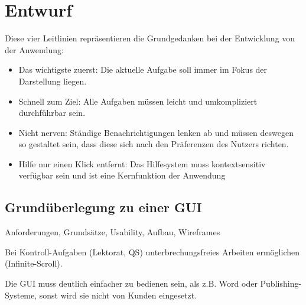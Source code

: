 \section{Entwurf}\label{l:entwurf}

Diese vier Leitlinien repräsentieren die Grundgedanken bei der Entwicklung von der Anwendung:

\begin{itemize}
\item{Das wichtigste zuerst: Die aktuelle Aufgabe soll immer im Fokus der Darstellung liegen.}
\item{Schnell zum Ziel: Alle Aufgaben müssen leicht und umkompliziert durchführbar sein.}
\item{Nicht nerven: Ständige Benachrichtigungen lenken ab und müssen deswegen so gestaltet sein, dass diese sich nach den Präferenzen des Nutzers richten.}
\item{Hilfe nur einen Klick entfernt: Das Hilfesystem muss kontextsensitiv verfügbar sein und ist eine Kernfunktion der Anwendung}
\end{itemize}

\subsection{Grundüberlegung zu einer GUI}

Anforderungen, Grundsätze, Usability, Aufbau, Wireframes

Bei Kontroll-Aufgaben (Lektorat, QS) unterbrechungsfreies Arbeiten ermöglichen (Infinite-Scroll).

Die GUI muss deutlich einfacher zu bedienen sein, als z.B. Word oder Publishing-Systeme, sonst wird sie nicht von Kunden eingesetzt.